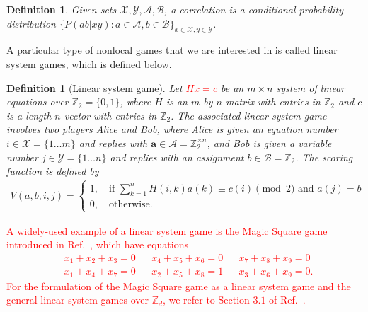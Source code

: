 \documentclass[11pt,letterpaper]{article}
\newcommand{\Z}{\mathbb{Z}}
\newcommand{\calX}{\mathcal{X}}
\newcommand{\calY}{\mathcal{Y}}
\newcommand{\calA}{\mathcal{A}}
\newcommand{\calB}{\mathcal{B}}
\newcommand{\1}{\mathbb{1}}
\newcommand{\ua}{\underline{a}}
\newcommand{\ba}{\pmb{a}}
\newcommand{\pr}[2]{P(#1|#2)}
\newcommand{\hf}[1]{\textcolor{red}{#1}}
\newtheorem{definition}[theorem]{Definition}
\theoremstyle{definition}
\begin{document}
\begin{definition}
	Given sets $\calX, \calY, \calA, \calB$, a correlation is a conditional probability distribution
	$\{\pr{ab}{xy}: a \in \calA, b \in \calB\}_{x \in \calX, y \in \calY}$.  
\end{definition}
A particular type of nonlocal games that we are interested in is called linear system games, which is defined below.
\begin{definition}[Linear system game]
 Let \hf{$Hx = c$} be an $m \times n$ system of linear equations over $\Z_2 = \{0, 1\}$,
 where $H$ is an $m$-by-$n$ matrix with entries in $\Z_2$ and 
 $c$ is a length-$n$ vector with entries in $\Z_2$. 
 The associated linear system game involves two
 players Alice and Bob, where Alice is given an equation number $i \in \calX = \{1 \dots m\}$ and replies with $\ba \in \calA = \Z_2^{\times n}$,
 and Bob is given a variable number $j \in \calY = \{1 \dots n\}$ and replies with an assignment $b \in \calB = \Z_2$. The 
 scoring function is defined by
 \begin{align}
 	V(\ua, b, i, j) =
	\begin{cases}
		1, \quad \text{if } \sum_{k=1}^n H(i,k) a(k) \equiv c(i) \pmod 2 \text{ and } a(j) = b \\
		0,  \quad \text{otherwise.}
	\end{cases}
\end{align}
\end{definition}
\hf{A widely-used example of a linear system game is the Magic Square game introduced in Ref.~\cite{magic_square}, which 
have equations
\begin{align*}
    &x_1 + x_2 + x_3 = 0 && x_4 + x_5 + x_6 = 0 &&
    x_7 + x_8 + x_9 = 0 \\
    &x_1 + x_4 + x_7 = 0 && x_2 + x_5 + x_8 = 1 &&
    x_3 + x_6 + x_9 = 0.
\end{align*}
For the formulation of the Magic Square game as a linear system game
and the general linear system games over $\Z_d$, we refer to Section $3.1$ of Ref.~\cite{coladan2017}.}
\end{document}
